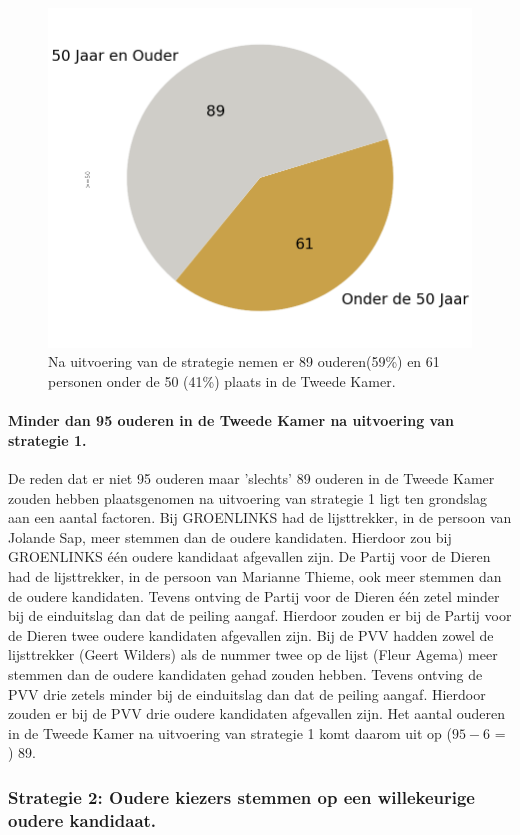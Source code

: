 \begin{figure}[H]
\centering
	\includegraphics[width=0.42\linewidth]{pie_chart_topN_ouderen.png}

			\caption{Na uitvoering van de strategie nemen er 89 ouderen(59\%) en 61 personen onder de 50 (41\%) plaats in de Tweede Kamer.}

\label{fig:pcS1O}
\end{figure}

\paragraph{Minder dan 95 ouderen in de Tweede Kamer na uitvoering van strategie 1.}
De reden dat er niet 95 ouderen maar 'slechts' 89 ouderen in de Tweede Kamer zouden hebben plaatsgenomen na uitvoering van strategie 1 ligt ten grondslag aan een aantal factoren. Bij GROENLINKS had de lijsttrekker, in de persoon van Jolande 
Sap, meer stemmen dan de oudere kandidaten. Hierdoor zou bij GROENLINKS één oudere kandidaat afgevallen zijn. De Partij voor de Dieren had de lijsttrekker, in de persoon van Marianne Thieme, ook meer stemmen dan de oudere kandidaten. Tevens ontving de Partij voor de Dieren één zetel minder bij de einduitslag dan dat de peiling aangaf. Hierdoor zouden er bij de Partij voor de Dieren twee oudere kandidaten afgevallen zijn. Bij de PVV hadden zowel de lijsttrekker (Geert Wilders) als de nummer twee op de lijst (Fleur Agema) meer stemmen dan de oudere kandidaten gehad zouden hebben. Tevens ontving de PVV drie zetels minder bij de einduitslag dan dat de peiling aangaf. Hierdoor zouden er bij de PVV drie oudere kandidaten afgevallen zijn. Het aantal ouderen in de Tweede Kamer na uitvoering van strategie 1 komt daarom uit op ($95-6$ = ) 89. 




\subsubsection{Strategie 2: Oudere kiezers stemmen op een willekeurige oudere kandidaat.}

